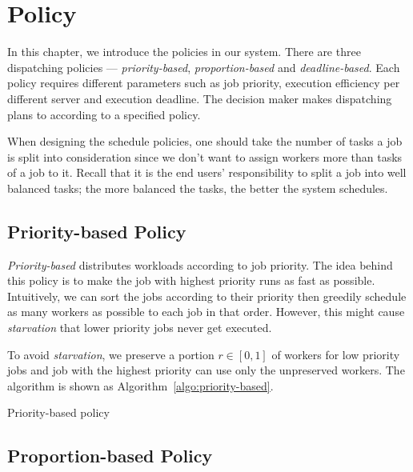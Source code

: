 \chapter{Policy}

In this chapter, we introduce the policies in our system.
There are three dispatching policies --- \emph{priority-based},
\emph{proportion-based} and \emph{deadline-based}.
Each policy requires different parameters such as job priority,
execution efficiency per different server and execution deadline.
The decision maker makes dispatching plans to according to a specified
policy.

When designing the schedule policies, one should take the number of
tasks a job is split into consideration since we don't want to assign
workers more than tasks of a job to it.
Recall that it is the end users' responsibility to split a job into well
balanced tasks; the more balanced the tasks, the better the system
schedules.


\section{Priority-based Policy}

\emph{Priority-based} distributes workloads according to job priority. 
The idea behind this policy is to make the job with highest priority runs as
fast as possible.
Intuitively, we can sort the jobs according to their priority then greedily
schedule as many workers as possible to each job in that order.
However, this might cause \emph{starvation} that lower priority jobs never get
executed.

To avoid \emph{starvation}, we preserve a portion $r \in [0,1]$ of workers for
low priority jobs and job with the highest priority can use only the
unpreserved workers.
The algorithm is shown as Algorithm~\ref{algo:priority-based}.

\begin{algorithm}[H]
  \DontPrintSemicolon %
  
  \caption{Priority-based policy}
  \label{algo:priority-based}
\end{algorithm}

\section{Proportion-based Policy}

